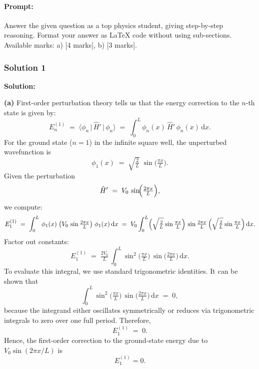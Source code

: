 \documentclass{article}
\begin{document}
\paragraph{Prompt: \\} 
Answer the given question as a top physics student, giving step-by-step reasoning. Format your answer as LaTeX code without using sub-sections. Available marks: a) [4 marks], b) [3 marks].


\subsubsection{Solution 1}
\textbf{Solution:}

\textbf{(a)} First-order perturbation theory tells us that the energy correction to the \(n\)-th state is given by:
\[
E_n^{(1)} \;=\; \langle \phi_n \,\vert\, \hat{H}' \,\vert\, \phi_n \rangle \;=\;
\int_{0}^{L}\phi_n(x)\,\hat{H}'\,\phi_n(x)\,\mathrm{d}x.
\]
For the ground state (\(n=1\)) in the infinite square well, the unperturbed wavefunction is
\[
\phi_{1}(x) \;=\; \sqrt{\tfrac{2}{L}}\;\sin\!\biggl(\tfrac{\pi x}{L}\biggr).
\]
Given the perturbation
\[
\hat{H}' \;=\; V_0 \,\sin\!\Bigl(\tfrac{2\pi x}{L}\Bigr),
\]
we compute:
\[
E_{1}^{(1)} \;=\;
\int_{0}^{L}\,\phi_{1}(x)\;\bigl(V_0 \,\sin\tfrac{2\pi x}{L}\bigr)\;\phi_{1}(x)\,\mathrm{d}x
\;=\; V_0 \int_{0}^{L} \Bigl(\sqrt{\tfrac{2}{L}}\sin\tfrac{\pi x}{L}\Bigr)\,\sin\tfrac{2\pi x}{L}\,\Bigl(\sqrt{\tfrac{2}{L}}\sin\tfrac{\pi x}{L}\Bigr)\,\mathrm{d}x.
\]
Factor out constants:
\[
E_{1}^{(1)} \;=\; \tfrac{2 V_0}{L}\,\int_{0}^{L} \sin^2\bigl(\tfrac{\pi x}{L}\bigr)\,\sin\bigl(\tfrac{2\pi x}{L}\bigr)\,\mathrm{d}x.
\]
To evaluate this integral, we use standard trigonometric identities. It can be shown that
\[
\int_{0}^{L} \sin^2\!\bigl(\tfrac{\pi x}{L}\bigr)\,\sin\!\bigl(\tfrac{2\pi x}{L}\bigr)\,\mathrm{d}x \;=\; 0,
\]
because the integrand either oscillates symmetrically or reduces via trigonometric integrals to zero over one full period. Therefore,
\[
E_{1}^{(1)} \;=\; 0.
\]
Hence, the first-order correction to the ground-state energy due to \(V_0\sin(2\pi x/L)\) is
\[
\boxed{E_{1}^{(1)} = 0.}
\]
\end{document}

